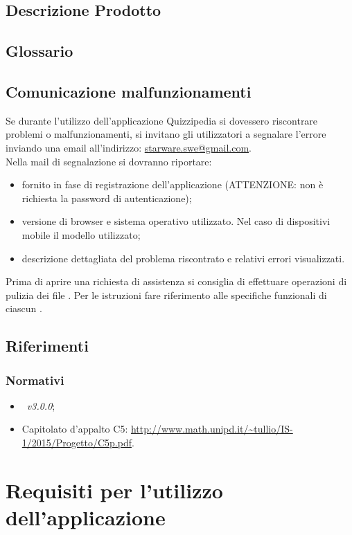 \documentclass[12pt,a4paper]{article}
\begin{document}
	\subsection{Descrizione Prodotto}
	\descrizioneProdotto
	
	\subsection{Glossario}
	\glossarioPrint
	\subsection{Comunicazione malfunzionamenti}
	Se durante l’utilizzo dell’applicazione Quizzipedia si dovessero riscontrare problemi o 	malfunzionamenti, si invitano gli utilizzatori a segnalare l’errore inviando una email all’indirizzo:
	\url{starware.swe@gmail.com}. \\
	Nella mail di segnalazione si dovranno riportare:
	\begin{itemize}
		\item {} fornito in fase di registrazione dell’applicazione (ATTENZIONE: non è richiesta la password di autenticazione);
		\item versione di browser e sistema operativo utilizzato. Nel caso di dispositivi mobile il modello utilizzato;
		\item descrizione dettagliata del problema riscontrato e relativi errori visualizzati.
	\end{itemize}
	Prima di aprire una richiesta di assistenza si consiglia di effettuare operazioni di pulizia dei file . Per le istruzioni fare riferimento alle specifiche funzionali di ciascun .
	
	\subsection{Riferimenti}
	
\subsubsection{Normativi}
\begin{itemize}
	\item \NdP\ \textit{v3.0.0};
	\item Capitolato d'appalto C5: \url{http://www.math.unipd.it/~tullio/IS-1/2015/Progetto/C5p.pdf}.
\end{itemize}

	
	\newpage
	\section{Requisiti per l'utilizzo dell'applicazione} 
\end{document}
